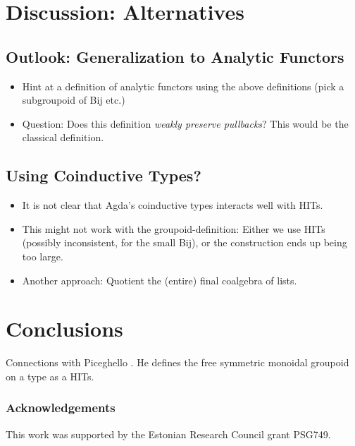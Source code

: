 \documentclass[runningheads]{llncs}
\begin{document}
\section{Discussion: Alternatives}
\subsection{Outlook: Generalization to Analytic Functors}

\begin{itemize}
    \item Hint at a definition of analytic functors using
        the above definitions (pick a subgroupoid of Bij etc.)
    \item Question:
        Does this definition \emph{weakly preserve pullbacks}?
        This would be the classical definition.
\end{itemize}

\subsection{Using Coinductive Types?}

\begin{itemize}
    \item It is not clear that Agda's coinductive types
        interacts well with HITs.
    \item This might not work with the groupoid-definition:
        Either we use HITs (possibly inconsistent, for the small Bij),
        or the construction ends up being too large.
    \item
        Another approach: Quotient the (entire) final coalgebra of lists.
\end{itemize}

\section{Conclusions}

Connections with Piceghello \cite{Piceghello2021}.
He defines the free symmetric monoidal groupoid on a type
  as a HITs.


\subsubsection{Acknowledgements}
  This work was supported by the Estonian Research Council grant PSG749.




\end{document}
